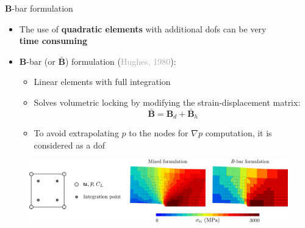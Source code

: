 \documentclass[9pt]{beamer}
\begin{document}

\begin{frame}{$\boldsymbol{B}$-bar formulation}
    
	\begin{itemize}
		\item The use of \textbf{quadratic elements} with additional dofs can be very \\ \textbf{time consuming}
		\vspace{0.25cm}
		\item $\boldsymbol{B}$-bar (or $\boldsymbol{\bar{B}}$) formulation (\textcolor{darkgray}{Hughes, 1980}): 
		\vspace{0.25cm}
		\begin{itemize}
			\item Linear elements with full integration
			\vspace{0.25cm}
			\item Solves volumetric locking by modifying the strain-displacement matrix: \\
			$$\boldsymbol{\bar{B}} = \boldsymbol{B}_d + \boldsymbol{\bar{B}}_h$$
			\vspace{0.05cm}
			\item To avoid extrapolating $p$ to the nodes for $\nabla p$ computation, it is considered as a dof
		\end{itemize}
	\end{itemize}	
	
	\vspace{0.25cm}	
	
	\begin{figure}
        \centering
        \includegraphics[width=1.\textwidth]{Images/comp_nlgeom-3f_B-bar.pdf}
    \end{figure}  
    
    
\end{frame}
\end{document}
